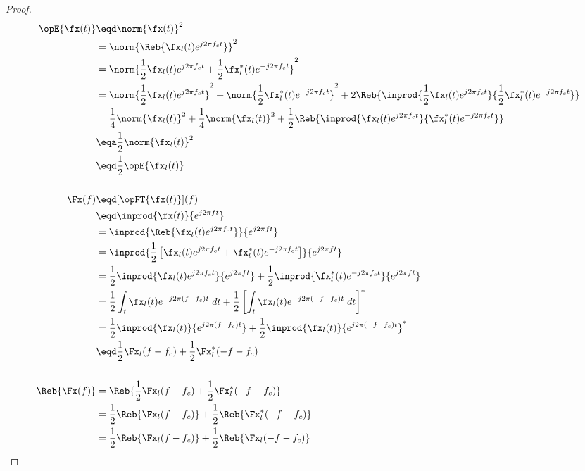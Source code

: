 \begin{proof}
\begin{align*}
   \opE{\fx(t)}
        &\eqd \norm{\fx(t)}^2
      \\&=    \norm{\Reb{ \fx_l(t)e^{j2\pi f_ct}}}^2
      \\&=    \norm{\frac{1}{2}\fx_l(t)e^{j2\pi f_ct} + \frac{1}{2}\fx_l^\ast(t)e^{-j2\pi f_ct} }^2
      \\&=    \norm{ \frac{1}{2}\fx_l(t)e^{j2\pi f_ct} }^2
         +    \norm{ \frac{1}{2}\fx_l^\ast(t)e^{-j2\pi f_ct} }^2
         +    2\Reb{\inprod{\frac{1}{2}\fx_l(t)e^{j2\pi f_ct}}{\frac{1}{2}\fx_l^\ast(t)e^{-j2\pi f_ct}}}
      \\&=    \frac{1}{4}\norm{ \fx_l(t) }^2
         +    \frac{1}{4}\norm{ \fx_l(t) }^2
         +    \frac{1}{2}\Reb{\inprod{\fx_l(t)e^{j2\pi f_ct}}{\fx_l^\ast(t)e^{-j2\pi f_ct}}}
      \\&\eqa \frac{1}{2}\norm{ \fx_l(t) }^2
      \\&\eqd \frac{1}{2}\opE{\fx_l(t)}
\\ \\
   \Fx(f)
        &\eqd [\opFT{\fx(t)}](f)
      \\&\eqd \inprod{\fx(t)}{e^{j2\pi ft}}
      \\&=    \inprod{\Reb{ \fx_l(t)e^{j2\pi f_ct}}}
                           {e^{j2\pi ft}}
      \\&=    \inprod{\frac{1}{2}\left[ \fx_l(t)e^{j2\pi f_ct} + \fx_l^\ast(t)e^{-j2\pi f_ct}   \right]}
                           {e^{j2\pi ft}}
      \\&=    \frac{1}{2} \inprod{\fx_l(t)     e^{ j2\pi f_ct}}{ e^{j2\pi ft}}
            + \frac{1}{2} \inprod{\fx_l^\ast(t)e^{-j2\pi f_ct}}{ e^{j2\pi ft}}
      \\&=    \frac{1}{2} \int_t  \fx_l(t)e^{-j2\pi(f-f_c)t}  \; dt
         +    \frac{1}{2} \left[ \int_t  \fx_l(t) e^{-j2\pi(- f-f_c)t} \; dt \right]^\ast
      \\&=    \frac{1}{2} \inprod{\fx_l(t)}{e^{j2\pi(f-f_c)t}}
         +    \frac{1}{2} \inprod{\fx_l(t)}{e^{j2\pi(- f-f_c)t}}^\ast
      \\&\eqd \frac{1}{2}\Fx_l(f-f_c) + \frac{1}{2}\Fx_l^\ast(-f-f_c)
\\ \\
   \Reb{\Fx(f)}
     &= \Reb{\frac{1}{2}\Fx_l(f-f_c) + \frac{1}{2}\Fx_l^\ast(-f-f_c)}
   \\&= \frac{1}{2}\Reb{\Fx_l(f-f_c)} + \frac{1}{2}\Reb{\Fx_l^\ast(-f-f_c)}
   \\&= \frac{1}{2}\Reb{\Fx_l(f-f_c)} + \frac{1}{2}\Reb{\Fx_l(-f-f_c)}

\end{align*}
\end{proof}
